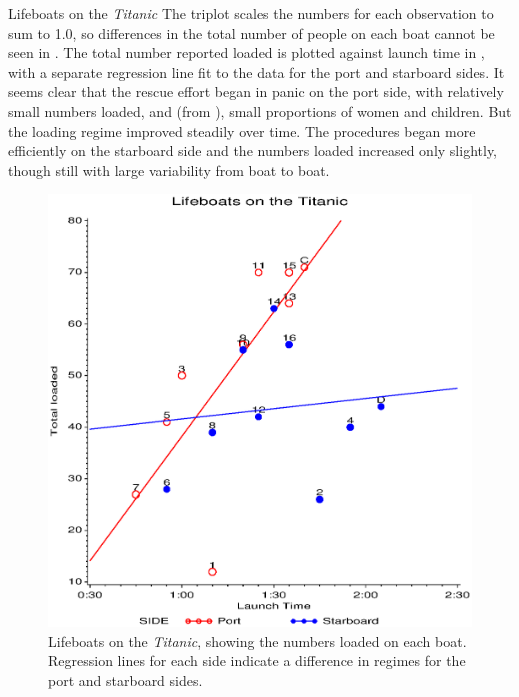 \begin{Example}[lifeboat1]{Lifeboats on the \emph{Titanic}}
The triplot scales the numbers for each observation to sum to 1.0,
so differences in the total number of people on each boat
cannot be seen in .
The total number reported loaded is plotted against launch time in ,
with a separate regression line fit to the data for the port and starboard
sides.
It seems clear that the rescue effort began in panic on the port side,
with relatively small numbers loaded, and (from ),
small proportions of women and children.
But the loading regime improved steadily over time.
The procedures began more efficiently on the starboard side
and the numbers loaded increased only slightly, though still
with large variability from boat to boat.
\begin{figure}[htb]
  \centering
  \includegraphics[scale=.6]{ch3/fig/lifeboat2}
  \caption[Lifeboats on the \emph{Titanic}]{Lifeboats on the \emph{Titanic},
  showing the numbers loaded on each boat.
  Regression lines for each side indicate a difference in regimes for
  the port and starboard sides.}%
  \label{fig:lifeboat2}
\end{figure}
\end{Example}
